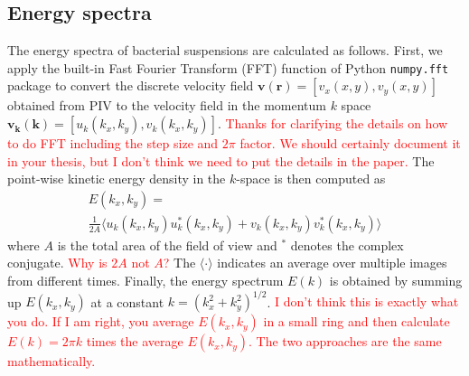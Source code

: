 \documentclass[twocolumn,aps,prx,amsmath,amssymb,longbibliography]{revtex4-2}
\begin{document}
\subsection{Energy spectra}
The energy spectra of bacterial suspensions are calculated as follows. First, we apply the built-in Fast Fourier Transform (FFT) function of Python \texttt{numpy.fft} package to convert the discrete velocity field $\bm{v}(\bm{r}) = [v_x(x,y), v_y(x,y)]$ obtained from PIV to the velocity field in the momentum $k$ space $\bm{v_k}(\bm{k}) = [u_k(k_x,k_y),v_k(k_x,k_y)]$. \textcolor{red}{Thanks for clarifying the details on how to do FFT including the step size and $2\pi$ factor. We should certainly document it in your thesis, but I don't think we need to put the details in the paper.} The point-wise kinetic energy density in the $k$-space is then computed as
\begin{multline}
E(k_x, k_y) = \\
\frac{1}{2A}\langle u_k(k_x, k_y)u^*_k(k_x, k_y)+v_k(k_x, k_y)v_k^*(k_x, k_y)\rangle
\end{multline}
where $A$ is the total area of the field of view and $^*$ denotes the complex conjugate. \textcolor{red}{Why is $2A$ not $A$?} The $\langle\cdot\rangle$ indicates an average over multiple images from different times. Finally, the energy spectrum $E(k)$ is obtained by summing up $E(k_x,k_y)$ at a constant $k=(k_x^2+k_y^2)^{1/2}$. \textcolor{red}{I don't think this is exactly what you do. If I am right, you average $E(k_x,k_y)$ in a small ring and then calculate $E(k) = 2\pi k$ times the average $E(k_x,k_y)$. The two approaches are the same mathematically.}

\end{document}
